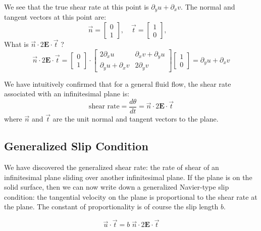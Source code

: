 \documentclass[12pt, a4paper, twoside, openright]{book}
\begin{document}
We see that the true shear rate at this point is $\partial_y u + \partial_x v$. The normal and tangent vectors at this point are:
\begin{equation}
\vec{n} = 
\begin{bmatrix}
0 \\ 1
\end{bmatrix}
, \quad
\vec{t} =
\begin{bmatrix}
1 \\ 0
\end{bmatrix}
, \quad
\end{equation}
 What is $\vec{n} \cdot 2 \mathbf{E} \cdot \vec{t}$ ?
\begin{equation}
\vec{n} \cdot 2 \mathbf{E} \cdot \vec{t} = 
\begin{bmatrix}
0 \\ 1
\end{bmatrix}
\cdot
\begin{bmatrix}
2 \partial_x u   & \partial_x v + \partial_y u  \\
\partial_y u + \partial_x v  &  2 \partial_y v
\end{bmatrix}
\begin{bmatrix}
1 \\ 0
\end{bmatrix}
=
\partial_y u + \partial_x v
\end{equation}


We have intuitively confirmed that for a general fluid flow, the shear rate associated with an infinitesimal plane is:
\begin{equation}
\text{shear rate} = \frac{d\theta}{dt} = \vec{n} \cdot 2 \mathbf{E} \cdot \vec{t}
\end{equation}
where $\vec{n}$ and $\vec{t}$ are the unit normal and tangent vectors to the plane.

\subsection{Generalized Slip Condition}

We have discovered the generalized shear rate: the rate of shear of an infinitesimal plane sliding over another infinitesimal plane.  If the plane is on the solid surface, then we can now write down a generalized Navier-type slip condition: the tangential velocity on the plane is proportional to the shear rate at the plane.  The constant of proportionality is of course the slip length $b$.

\begin{equation}
\vec{u} \cdot \vec{t} = b \; \vec{n} \cdot 2 \mathbf{E} \cdot \vec{t}
\end{equation}
\end{document}

